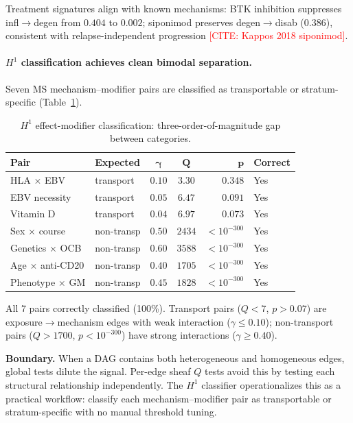 \documentclass[11pt]{article}
\newcommand{\misscite}[1]{\textcolor{red}{[CITE: #1]}}
\begin{document}
Treatment signatures align with known mechanisms: BTK inhibition suppresses infl$\to$degen from $0.404$ to $0.002$; siponimod preserves degen$\to$disab ($0.386$), consistent with relapse-independent progression \misscite{Kappos 2018 siponimod}.

\paragraph{$H^1$ classification achieves clean bimodal separation.}
Seven MS mechanism--modifier pairs are classified as transportable or stratum-specific (Table~\ref{tab:h1}).

\begin{table}[t]
\centering
\caption{$H^1$ effect-modifier classification: three-order-of-magnitude gap between categories.}
\label{tab:h1}
\small
\begin{tabular}{@{}llccrl@{}}
\toprule
\textbf{Pair} & \textbf{Expected} & $\boldsymbol{\gamma}$ & $\boldsymbol{Q}$ & $\boldsymbol{p}$ & \textbf{Correct} \\
\midrule
HLA $\times$ EBV & transport & $0.10$ & $3.30$ & $0.348$ & Yes \\
EBV necessity & transport & $0.05$ & $6.47$ & $0.091$ & Yes \\
Vitamin D & transport & $0.04$ & $6.97$ & $0.073$ & Yes \\
\midrule
Sex $\times$ course & non-transp & $0.50$ & $2434$ & $< 10^{-300}$ & Yes \\
Genetics $\times$ OCB & non-transp & $0.60$ & $3588$ & $< 10^{-300}$ & Yes \\
Age $\times$ anti-CD20 & non-transp & $0.40$ & $1705$ & $< 10^{-300}$ & Yes \\
Phenotype $\times$ GM & non-transp & $0.45$ & $1828$ & $< 10^{-300}$ & Yes \\
\bottomrule
\end{tabular}
\end{table}

All 7 pairs correctly classified (100\%).
Transport pairs ($Q < 7$, $p > 0.07$) are exposure$\to$mechanism edges with weak interaction ($\gamma \leq 0.10$); non-transport pairs ($Q > 1700$, $p < 10^{-300}$) have strong interactions ($\gamma \geq 0.40$).

\textbf{Boundary.} When a DAG contains both heterogeneous and homogeneous edges, global tests dilute the signal.
Per-edge sheaf $Q$ tests avoid this by testing each structural relationship independently.
The $H^1$ classifier operationalizes this as a practical workflow: classify each mechanism--modifier pair as transportable or stratum-specific with no manual threshold tuning.
\end{document}
